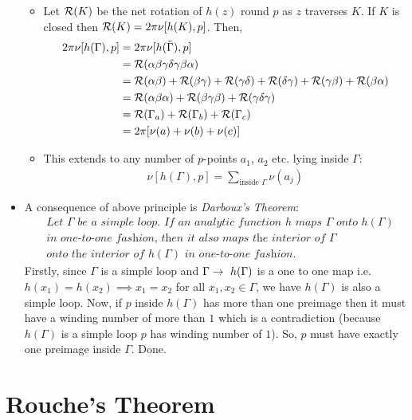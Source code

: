 \documentclass[12pt]{article}
\def\tt{\textit}
\def\mc{\ensuremath\mathcal}
\def\td{\ensuremath\tilde}
\def\rto{\ensuremath\rightarrow\ }
\begin{document}
\begin{itemize}
\begin{itemize}
        \item Let $\mc{R}(K)$ be the net rotation of $h(z)$ round $p$ as $z$ traverses $K$. If $K$ is closed then $\mc{R}(K) = 2\pi \nu [h(K),p]$. Then,
        \begin{align*}
            2\pi \nu[h(\Gamma),p] &= 2\pi \nu[h(\td{\Gamma}), p]\\
            &= \mc{R}(\alpha\beta\gamma\delta\gamma\beta\alpha)\\
            &= \mc{R}(\alpha\beta) + \mc{R}(\beta\gamma) + \mc{R}(\gamma\delta) + \mc{R}(\delta\gamma) + \mc{R}(\gamma\beta) + \mc{R}(\beta\alpha)\\
            &= \mc{R}(\alpha\beta\alpha) + \mc{R}(\beta\gamma\beta) + \mc{R}(\gamma\delta\gamma)\\
            &= \mc{R}(\Gamma_a) + \mc{R}(\Gamma_b) + \mc{R}(\Gamma_c)\\
            &= 2\pi[\nu(a) + \nu(b) + \nu(c)]
        \end{align*}
        \item This extends to any number of $p$-points $a_1$, $a_2$ etc. lying inside $\Gamma$:
        \begin{align*}
            \nu[h(\Gamma),p] = \sum\limits_{\text{inside }\Gamma} \nu(a_j)
        \end{align*}
    \end{itemize}
    \item A consequence of above principle is \tt{Darboux's Theorem}:
    \begin{align*}
        &\tt{Let $\Gamma$ be a simple loop. If an analytic function $h$ maps $\Gamma$ onto $h(\Gamma)$}\\
        &\tt{in one-to-one fashion, then it also maps the interior of $\Gamma$}\\
        &\tt{onto the interior of $h(\Gamma)$ in one-to-one fashion.}
    \end{align*}
    Firstly, since $\Gamma$ is a simple loop and $\Gamma \rto h(\Gamma)$ is a one to one map i.e. $h(x_1)=h(x_2)\implies x_1 = x_2$ for all $x_1,x_2\in \Gamma$, we have $h(\Gamma)$ is also a simple loop. Now, if $p$ inside $h(\Gamma)$ has more than one preimage then it must have a winding number of more than $1$ which is a contradiction (because $h(\Gamma)$ is a simple loop $p$ has winding number of $1$). So, $p$ must have exactly one preimage inside $\Gamma$. Done.
\end{itemize}
\section{Rouche's Theorem}
\end{document}
